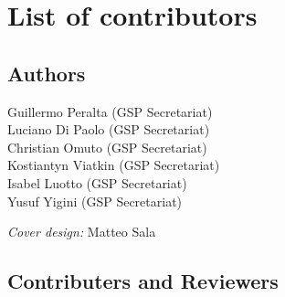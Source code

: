 \documentclass[
  10pt,
  b5paper,
]{book}
\begin{document}
\frontmatter
{}   
\tableofcontents
\listoffigures
\listoftables
\printnomenclature
\mainmatter
\pagestyle{fancy}

\hypertarget{list-of-contributors}{%
\chapter*{List of contributors}\label{list-of-contributors}}

\hypertarget{authors}{%
\section*{Authors}\label{authors}}

Guillermo Peralta (GSP Secretariat)\\
Luciano Di Paolo (GSP Secretariat)\\
Christian Omuto (GSP Secretariat)\\
Kostiantyn Viatkin (GSP Secretariat)\\
Isabel Luotto (GSP Secretariat)\\
Yusuf Yigini (GSP Secretariat)

\emph{Cover design:} Matteo Sala

\hypertarget{contributers-and-reviewers}{%
\section*{Contributers and Reviewers}\label{contributers-and-reviewers}}
\end{document}
